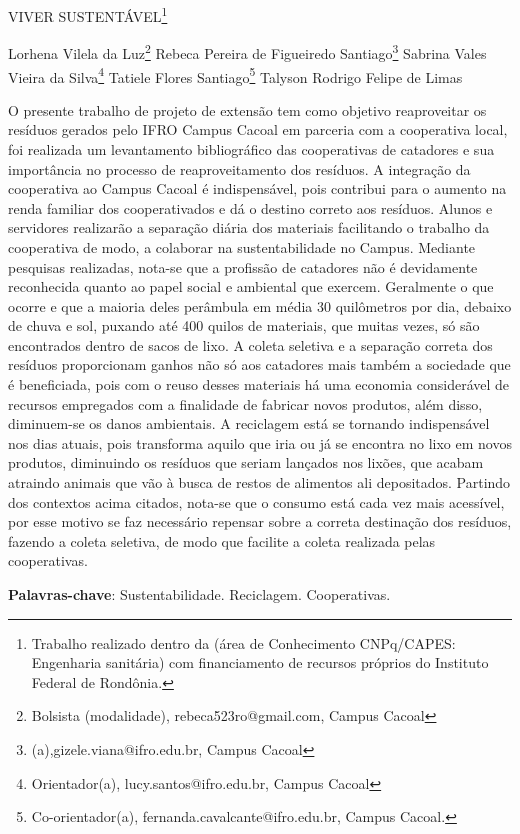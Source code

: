 \documentclass[article,12pt,onesidea,4paper,english,brazil]{abntex2}
\begin{document}
	
	
	\frenchspacing 
	
	\begin{center}
		\LARGE VIVER SUSTENTÁVEL\footnote{Trabalho realizado dentro da (área de Conhecimento CNPq/CAPES: Engenharia sanitária) com financiamento de recursos próprios do Instituto Federal de Rondônia.}
		
		\normalsize
		Lorhena Vilela da Luz\footnote{Bolsista (modalidade), rebeca523ro@gmail.com, Campus Cacoal} 
		Rebeca Pereira de Figueiredo Santiago\footnote{(a),gizele.viana@ifro.edu.br, Campus Cacoal} 
		Sabrina Vales Vieira da Silva\footnote{Orientador(a), lucy.santos@ifro.edu.br, Campus Cacoal} 
		Tatiele Flores Santiago\footnote{Co-orientador(a), fernanda.cavalcante@ifro.edu.br, Campus Cacoal.}
		Talyson Rodrigo Felipe de Limas 
	\end{center}
	
	\noindent O presente trabalho de projeto de extensão tem como objetivo reaproveitar os resíduos gerados pelo IFRO Campus Cacoal em parceria com a cooperativa local, foi realizada um levantamento bibliográfico das cooperativas de catadores e sua importância no processo de reaproveitamento dos resíduos. A integração da cooperativa ao Campus Cacoal é indispensável, pois contribui para o aumento na renda familiar dos cooperativados e dá o destino correto aos resíduos.   Alunos e servidores realizarão a separação diária dos materiais facilitando o trabalho da cooperativa de modo, a colaborar na sustentabilidade no Campus. Mediante pesquisas realizadas, nota-se que a profissão de catadores não é devidamente reconhecida quanto ao papel social e ambiental que exercem. Geralmente o que ocorre e que a maioria deles perâmbula em média 30 quilômetros por dia, debaixo de chuva e sol, puxando até 400 quilos de materiais, que muitas vezes, só são encontrados dentro de sacos de lixo. A coleta seletiva e a separação correta dos resíduos proporcionam ganhos não só aos catadores mais também a sociedade que é beneficiada, pois com o reuso desses materiais há uma economia considerável de recursos empregados com a finalidade de fabricar novos produtos, além disso, diminuem-se os danos ambientais. A reciclagem está se tornando indispensável nos dias atuais, pois transforma aquilo que iria ou já se encontra no lixo em novos produtos, diminuindo os resíduos que seriam lançados nos lixões, que acabam atraindo animais que vão à busca de restos de alimentos ali depositados. Partindo dos contextos acima citados, nota-se que o consumo está cada vez mais acessível, por esse motivo se faz necessário repensar sobre a correta destinação dos resíduos, fazendo a coleta seletiva, de modo que facilite a coleta realizada pelas cooperativas.
	
	\vspace{\onelineskip}
	
	\noindent
	\textbf{Palavras-chave}: Sustentabilidade. Reciclagem. Cooperativas.
	
\end{document}
